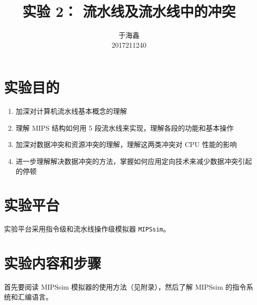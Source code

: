 \documentclass[blue,normal,cn]{elegantnote}
\title{实验 2： 流水线及流水线中的冲突}
\date{\zhtoday}
\newcommand{\code}[1]{\colorbox{light-gray}{\texttt{#1}}}
\begin{document}
\author{
    \begin{tabular}[t]{c}
        于海鑫 \\
        2017211240
    \end{tabular}
}
\maketitle

\section{实验目的}
\begin{enumerate}
    \item 加深对计算机流水线基本概念的理解
    \item 理解 MIPS 结构如何用 5 段流水线来实现，理解各段的功能和基本操作
    \item 加深对数据冲突和资源冲突的理解，理解这两类冲突对 CPU 性能的影响
    \item 进一步理解解决数据冲突的方法，掌握如何应用定向技术来减少数据冲突引起的停顿
\end{enumerate}

\section{实验平台}

实验平台采用指令级和流水线操作级模拟器 \code{MIPSsim}。

\section{实验内容和步骤}

首先要阅读 MIPSsim 模拟器的使用方法（见附录），然后了解 MIPSsim 的指令系统和汇编语言。
\end{document}
